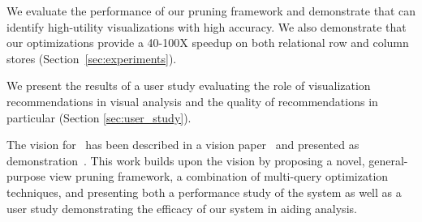 \begin{denselist}
  \item We evaluate the performance of our pruning framework and demonstrate that \SeeDB
  can identify high-utility visualizations with high accuracy. We also demonstrate that 
  our optimizations provide a 40-100X speedup on both relational row and column stores
  (Section~\ref{sec:experiments}). 
  \item We present the results of a user study evaluating the role of visualization 
  recommendations in visual analysis and the quality of \SeeDB recommendations in particular
  (Section \ref{sec:user_study}).
\end{denselist}

The vision for \SeeDB\ has been described in a vision paper~\cite{DBLP:conf/vldb/Parameswaran2013} and presented as demonstration~\cite{DBLP:journals/pvldb/VartakMPP14}. 
This work builds upon the \SeeDB vision by proposing a novel, general-purpose view 
pruning framework, a combination of multi-query optimization techniques, and presenting 
both a performance study of the system as well as a user study demonstrating the efficacy of our system in aiding analysis.




